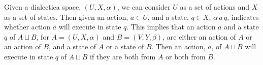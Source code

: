 Given a dialectica space, $(U, X, \alpha)$, we can consider $U$ as a
set of actions and $X$ as a set of states.  Then given an action, $a
\in U$, and a state, $q \in X$, $\alpha\,a\,q$, indicates whether
action $a$ will execute in state $q$.  This implies that an action $a$
and a state $q$ of $A \sqcup B$, for $A = (U , X , \alpha)$ and $B =
(V , Y , \beta)$, are either an action of $A$ or an action of $B$, and
a state of $A$ or a state of $B$.  Then an action, $a$, of $A \sqcup
B$ will execute in state $q$ of $A \sqcup B$ if they are both from $A$
or both from $B$.  
